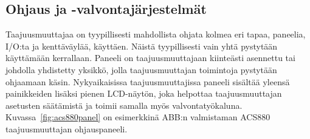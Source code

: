 \documentclass[finnish,12pt,a4paper,pdftex,elec,utf8]{aaltothesis}
\begin{document}
	



\subsection{Ohjaus ja -valvontajärjestelmät}
Taajuusmuuttajaa on tyypillisesti mahdollista ohjata kolmea eri tapaa, paneelia, I/O:ta ja kenttäväylää, käyttäen. Näistä tyypillisesti vain yhtä pystytään käyttämään kerrallaan. Paneeli on taajuusmuuttajaan kiinteästi asennettu tai johdolla yhdistetty yksikkö, jolla taajuusmuuttajan toimintoja pystytään ohjaamaan käsin. Nykyaikaisissa taajuusmuuttajissa paneeli sisältää yleensä painikkeiden lisäksi pienen LCD-näytön, joka helpottaa taajuusmuuttajan asetusten säätämistä ja toimii samalla myös valvontatyökaluna. Kuvassa~\ref{fig:acs880panel} on esimerkkinä ABB:n valmistaman ACS880 taajuusmuuttajan ohjauspaneeli. 
\end{document}
